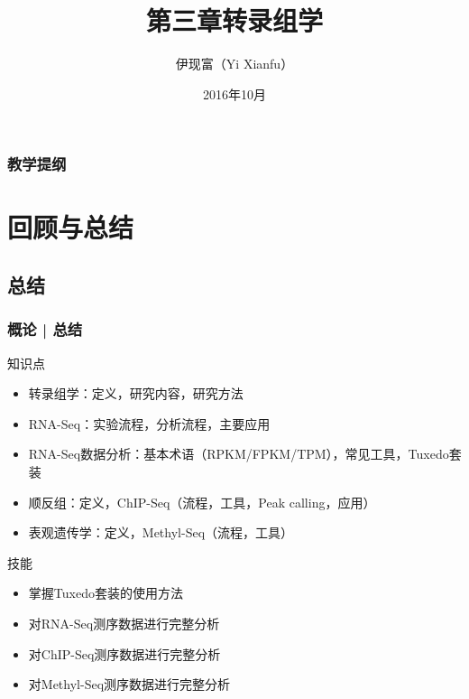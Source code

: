 



\title[转录组学]{第三章\quad 转录组学}
\author[Yixf]{伊现富（Yi Xianfu）}
\date{2016年10月}


\begin{frame}[label=current]
  \titlepage
\end{frame}

\begin{frame}[plain,label=current]
  \frametitle{教学提纲}
  \setcounter{tocdepth}{3}
  \begin{multicols}{2}
    \tableofcontents
  \end{multicols}
\end{frame}








\section{回顾与总结}
\subsection{总结}
\begin{frame}[label=current]
  \frametitle{概论 | 总结}
  \begin{block}{知识点}
    \begin{itemize}
      \item 转录组学：定义，研究内容，研究方法
      \item RNA-Seq：实验流程，分析流程，主要应用
      \item RNA-Seq数据分析：基本术语（RPKM/FPKM/TPM），常见工具，Tuxedo套装
      \item 顺反组：定义，ChIP-Seq（流程，工具，Peak calling，应用）
      \item 表观遗传学：定义，Methyl-Seq（流程，工具）
    \end{itemize}
  \end{block}
  \begin{block}{技能}
    \begin{itemize}
      \item 掌握Tuxedo套装的使用方法
      \item 对RNA-Seq测序数据进行完整分析
      \item 对ChIP-Seq测序数据进行完整分析
      \item 对Methyl-Seq测序数据进行完整分析
    \end{itemize}
  \end{block}
\end{frame}

